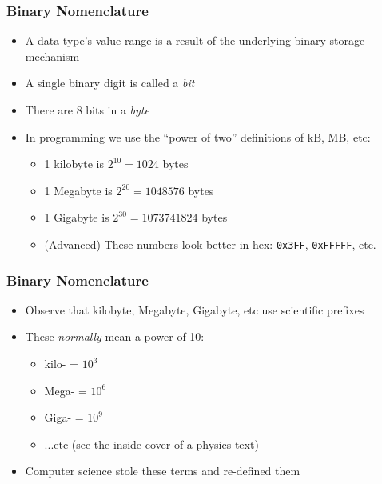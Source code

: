 \documentclass[14pt]{beamer}
\begin{document}
\begin{frame}
\frametitle{Binary Nomenclature}
\begin{itemize}
\item A data type's value range is a result of the underlying binary storage mechanism
\item A single binary digit is called a \textit{bit}
\item There are 8 bits in a \textit{byte}
\item In programming we use the ``power of two'' definitions of kB, MB, etc:
	\begin{itemize}
		\item 1 kilobyte is $2^{10} = 1024$ bytes
		\item 1 Megabyte is $2^{20} = 1048576$ bytes
		\item 1 Gigabyte is $2^{30} = 1073741824$ bytes
		\item (Advanced) These numbers look better in hex: \texttt{0x3FF}, \texttt{0xFFFFF}, etc.
	\end{itemize}
\end{itemize}
\end{frame}

\begin{frame}
\frametitle{Binary Nomenclature}
\begin{itemize}
\item Observe that kilobyte, Megabyte, Gigabyte, etc use scientific prefixes
\item These \textit{normally} mean a power of 10:
	\begin{itemize}
		\item kilo- = $10^3$
		\item Mega- = $10^6$
		\item Giga- = $10^9$
		\item ...etc (see the inside cover of a physics text)
	\end{itemize}
\item Computer science stole these terms and re-defined them

\end{itemize}
\end{frame}
\end{document}
